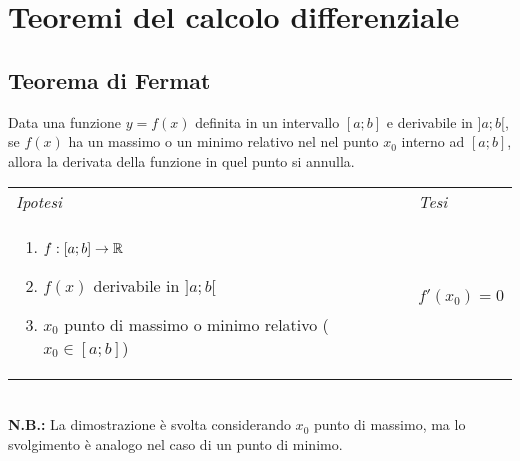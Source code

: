 \section{Teoremi del calcolo differenziale}
    \subsection{Teorema di Fermat}
        \begin{shadedTheorem}[Fermat]
            Data una funzione $y=f(x)$ definita in un intervallo $[a;b]$ e derivabile in $]a;b[$, se $f(x)$ ha un massimo o un minimo relativo nel nel punto $x_0$ interno ad $[a;b]$, allora la derivata della funzione in quel punto si annulla.
        \end{shadedTheorem}
        \begin{tabular}{m{}m{}}
            \textit{Ipotesi} & \textit{Tesi}  \\
            \begin{enumerate}
                \item $f:[a;b]\to\mathbb{R}$
                \item $f(x)$ derivabile in $]a;b[$
                \item $x_0$ punto di massimo o minimo relativo ($x_0\in [a;b]$)
            \end{enumerate} & $f'(x_0)=0$
        \end{tabular}\\
        \textbf{N.B.:} La dimostrazione è svolta considerando $x_0$ punto di massimo, ma lo svolgimento è analogo nel caso di un punto di minimo.
